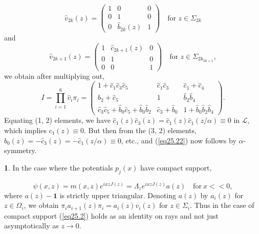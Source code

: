 \documentclass{surv-l}
\theoremstyle{plain}
\theoremstyle{definition}
\newtheorem{remark}[theorem]{\sc{Remark}}
\numberwithin{equation}{chapter}
\begin{document}
\begin{equation*}
\hat{v}_{2k}(z)=\left(\begin{array}{ccc}
1 & 0 & 0\\
0 & 1 & 0\\
0 & \hat{b}_{2k}(z) & 1
\end{array}\right) \quad \text{for } z\in\Sigma_{2k}
\end{equation*}
and
\begin{equation*}
\hat{v}_{2k+1}(z)= \left(\begin{array}{ccc}
1 & \hat{c}_{2k+1}(z) & 0\\
0 & 1  & 0\\
0 & 0  & 1
\end{array}\right)\quad \text{for } z\in\Sigma_{2k_{2k+1}},
\end{equation*}
we obtain after multiplying out,
\begin{equation*}
I=\prod_{i=1}^{6}\hat{v}_{i}\pi_{i}=\left(\begin{array}{ccc}
1 + \hat{c}_{1}\hat{c}_{3}\hat{c}_{5} & \hat{c}_{1}\hat{c}_{3} & \hat{c}_{1} + \hat{c}_{4}\\
\hat{b}_{2}+\hat{c}_{5} & 1 & \hat{b}_{2}\hat{b}_{4}\\
\hat{c}_{3}\hat{c}_{5} + \hat{b}_{0}\hat{c}_{5} + \hat{b}_{0}\hat{b}_{2} & \hat{c}_{3}+\hat{b}_{0} & 1 + \hat{b}_{0}\hat{b}_{2}\hat{b}_{4}
\end{array}\right).
\end{equation*}
Equating (1, 2) elements, we have $\hat{c}_{1}(z)\hat{c}_{3}(z) =\hat{c}_{1}(z)\hat{c}_{1}(z/\alpha)\equiv 0$ in $\mathscr{L}$, which implies $c_{1}(z)\equiv 0$. But then from the (3, 2) elements, $\hat{b}_{0}(z)=-\hat{c}_{3}(z) = -\hat{c}_{1}(z/\alpha)\equiv 0$, etc., and (\ref{eq25.22}) now follows by $\alpha$-symmetry.


\renewcommand\thetheorem{25.\arabic{theorem}}
\setcounter{theorem}{22}
\begin{remark}\label{rem25.23}
In the case where the potentials $p_{j}(x)$ have compact support,
\end{remark}
\begin{equation*}
\psi(x,z)=m(x, z)e^{ixzJ(z)}=\Lambda_{z}e^{ixzJ(z)}a(z)\quad \mathrm{for}\ x < < 0,
\end{equation*}
where $a(z)-\mathbf{1}$ is strictly upper triangular. Denoting $a(z)$ by $a_{i}(z)$ for $z\in\Omega_{i}$, we obtain $\pi_{i}a_{i+1}(z)\pi_{i}=a_{i}(z)v_{i}(z)$ for $z\in\Sigma_{i}$. Thus in the case of compact support (\ref{eq25.2}) holds as an identity on rays and not just asymptotically as $z\rightarrow 0$.
\end{document}
